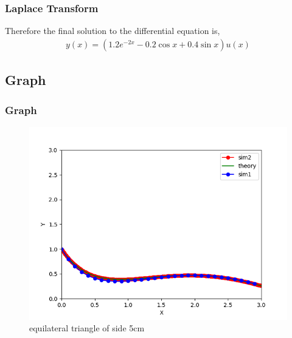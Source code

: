 \documentclass{beamer}
\providecommand{\brak}[1]{\ensuremath{\left(#1\right)}}
\theoremstyle{remark}
\numberwithin{equation}{section}
\begin{document}
\begin{frame}
\frametitle{Laplace Transform}
Therefore the final solution to the differential equation is,
\begin{align}
    y\brak{x} = \brak{1.2e^{-2x} - 0.2\cos x + 0.4\sin x}u\brak{x}
\end{align}
\end{frame}

\subsection{Graph}
\begin{frame}[fragile]
\frametitle{Graph}
\begin{figure}[h!]
   \centering
   \includegraphics[width=0.7\linewidth]{figs/fig.png}
   \caption{equilateral triangle of side 5cm}
\end{figure}
\end{frame}
\end{document}
